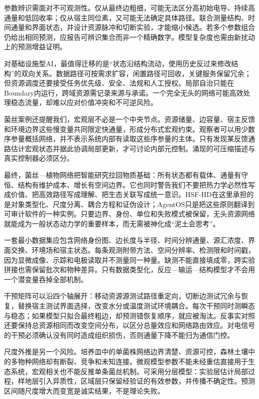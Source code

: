 参数辨识需面对不可观测性。仅从最终边粗细，可能无法区分高初始电导、持续高通量和低回收率；仅从宿主同位素，又可能无法确定具体路径。联合测量结构、时间通量和界面状态，并设计资源脉冲和切断实验，才能缩小候选。若多个参数组合仍给出相同预测，应报告可辨识集合而非一个精确数字。模型复杂度也需由新扰动上的预测增益证明。

对基础设施型AI，最值得迁移的是“状态沿结构流动，使用历史反过来修改结构”的双向关系。数据路径可按需求扩容，闲置路径可回收，关键服务保留冗余；但资源调度还要接受任务优先级、安全、法规和人工授权。局部自治只能在Boundary内运行，跨域资源需记录来源与承诺。一个完全无头的网络可能高效处理稳态流量，却难以应对价值冲突和不可逆风险。

菌丝案例还提醒我们，宏观层不必是一个中央节点。资源储量、边容量、宿主反馈和环境边界这些慢变量共同限定快通量，形成分布式宏观约束。观察者可以用少数序参量概括网络，并不表示系统内部有读取这些序参量的主体。只有发现某反馈通路估计宏观状态并据此协调局部更新，才可讨论内部元控制。涌现的可压缩描述与真实控制器必须区分。

最终，菌丝—植物网络把智能研究拉回物质基础：所有状态都有载体、通量有守恒、结构有维护成本、增长有空间边界。它也同时警告我们不要把热力学必然性写成价值、把高效路径写成理解、把生态关联写成统一意识。HSF-HD在这里承担的是对象类型化、尺度分离、耦合方程和证伪设计；AgentOS只是把这些原则翻译到可审计软件的一种实例。只要边界、身份、单位和失败模式被保留，无头资源网络就能成为一般状态动力学的重要样本，而无需被神化成“泥土会思考”。

一套最小数据集应包含网络身份图、边长度与半径、时间分辨通量、源汇浓度、界面交换、环境场和宿主状态。每条观测附带方法、空间分辨率、检测限和时间戳，因为显微成像、示踪和电极读取并不测量同一种量。缺测不能直接填成零，跨实验拼接也需保留批次和物种差异。只有数据类型化，反应—输运—结构模型才不会用一个潜变量吞掉全部机制。

干预矩阵可以沿四个轴展开：移动资源源测试路径重定向，切断边测试冗余与恢复，替换宿主测试界面选择，改变水分或温度测试环境耦合。每次干预同时测瞬态与稳态；如果模型只拟合最终粗边，却预测错恢复顺序，就应被淘汰。反事实对照还要保持总资源相同而改变空间分布，以区分总量效应和网络路由效应。对电信号的干预必须确认没有同时造成组织损伤，否则通量下降不能归为通信门控。

尺度外推是另一个风险。培养皿中的单菌株网络边界清楚、资源可控，森林土壤中的多物种网络却有断裂、竞争和未知连接。微观模型参数不能未经重估直接用于生态系统，宏观相关也不能反推单条菌丝机制。可采用分层模型：实验层估计局部过程，样地层引入异质性，区域层只保留经验证的有效参数，并传播不确定性。预测区间随尺度增大而变宽是诚实结果，不是理论失败。

